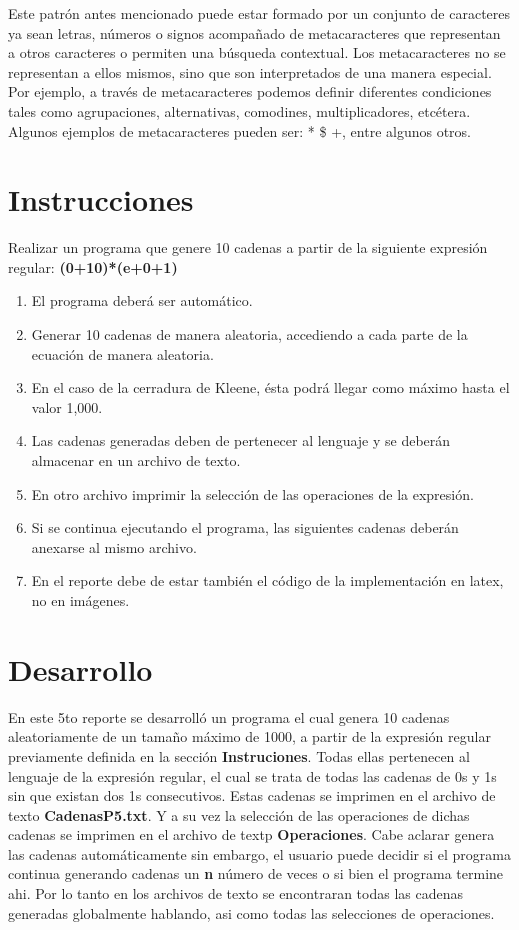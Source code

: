 \documentclass{article}
\begin{document}
	Este patrón antes mencionado puede estar formado por un conjunto de caracteres ya sean letras, números o signos acompañado de metacaracteres que representan a otros caracteres o permiten una búsqueda contextual.
	Los metacaracteres no se representan a ellos mismos, sino que son interpretados de una manera especial. Por ejemplo, a través de metacaracteres podemos definir diferentes condiciones tales como agrupaciones, alternativas, comodines, multiplicadores, etcétera. Algunos ejemplos de metacaracteres pueden ser: * \$ +, entre algunos otros.	
	\section*{Instrucciones}
	Realizar un programa que genere 10 cadenas a partir de la siguiente expresión regular:
	\textbf{(0+10)*(e+0+1)}
	\begin{enumerate}
		\item El programa deberá ser automático.
		\item Generar 10 cadenas de manera aleatoria, accediendo a cada parte de la ecuación de manera aleatoria.
		\item En el caso de la cerradura de Kleene, ésta podrá llegar como máximo hasta el valor 1,000.
		\item Las cadenas generadas deben de pertenecer al lenguaje y se deberán almacenar en un archivo de texto.
		\item En otro archivo imprimir la selección de las operaciones de la expresión.
		\item Si se continua ejecutando el programa, las siguientes cadenas deberán anexarse al mismo archivo.
		\item En el reporte debe de estar también el código de la implementación en latex, no en imágenes.		
	\end{enumerate}

	\section*{Desarrollo}
	En este 5to reporte se desarrolló un programa el cual genera 10 cadenas aleatoriamente de un tamaño máximo de 1000, a partir de la expresión regular previamente definida en la sección \textbf{Instruciones}.
	Todas ellas pertenecen al lenguaje de la expresión regular, el cual se trata de todas las cadenas de 0s y 1s sin que existan dos 1s consecutivos. Estas cadenas se imprimen en el archivo de texto \textbf{CadenasP5.txt}. Y a su vez la selección de las operaciones de dichas cadenas se imprimen en el archivo de textp \textbf{Operaciones}. Cabe aclarar genera las cadenas automáticamente sin embargo, el usuario puede decidir si el programa continua generando cadenas un \textbf{n} número de veces o si bien el programa termine ahi. Por lo tanto en los archivos de texto se encontraran todas las cadenas generadas globalmente hablando, asi como todas las selecciones de operaciones.
	
\end{document}
